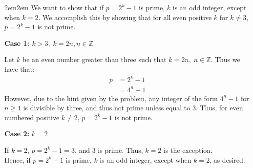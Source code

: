 \documentclass[10pt,oneside]{book}
\newcommand{\Z}{\mathbb{Z}}\newcommand{\R}{\mathbb{R}}\newcommand{\N}{\mathbb{N}}
\newcommand{\gspc}{\vspace{0.13cm}} %
\newcommand{\gline}{\gspc\\} %
\newcommand{\centerit}[1]{{\begin{center} #1 \end{center}}}
\let\endoldproof\endproof
\renewenvironment{proof}[1][\proofname]
  {\vspace{0.2cm}\begin{adjustwidth}{2em}{2em}
   \oldproof[#1]}
  {\endoldproof
\end{adjustwidth}}
\begin{document}
\begin{enumerate}
\begin{enumerate}
		\begin{proof}
			We want to show that if $p = 2^k - 1$ is prime, $k$ is an odd integer, except when $k = 2$. We accomplish this by showing that for all even positive $k$ for $k\ne 3$, $p = 2^k - 1$ is not prime. 
			\centerit{\textbf{Case 1: $k > 3, \;k = 2n, n\in \Z$}}
			Let $k$ be an even number greater than three such that $k = 2n,\;n\in\Z$. Thus we have that:
			\begin{align*}
				p &= 2^k - 1\\
				&= 4^n - 1
			\end{align*}
			However, due to the hint given by the problem, any integer of the form $4^n - 1$ for $n\ge 1$ is divisible by three, and thus not prime unless equal to 3. Thus, for even numbered positive $k\ne 2$, $p= 2^k - 1$ is not prime. \gline
			\centerit{\textbf{Case 2: }$k= 2$}
			If $k = 2$, $p = 2^k - 1 = 3$, and 3 is prime. Thus, $k=2$ is the exception.\gline
			Hence, if $p = 2^k - 1$ is prime, $k$ is an odd integer, except when $k = 2$, as desired. 
		\end{proof}
	\end{enumerate}
\end{enumerate}
\end{document}
